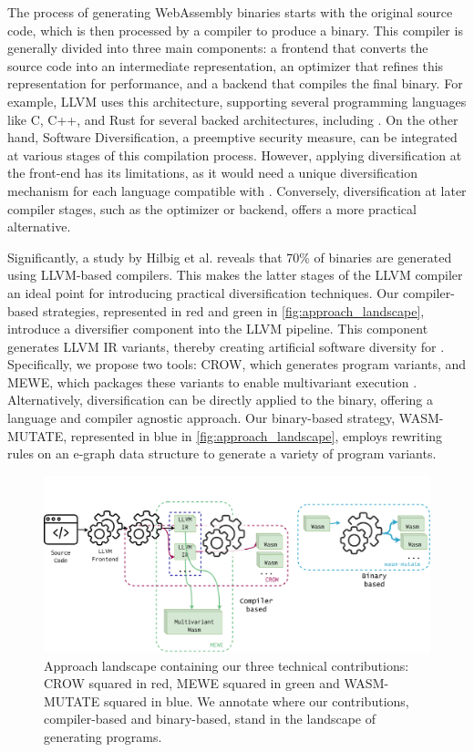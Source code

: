 
The process of generating WebAssembly binaries starts with the original source code, which is then processed by a compiler to produce a \Wasm binary. 
This compiler is generally divided into three main components: a frontend that converts the source code into an intermediate representation, an optimizer that refines this representation for performance, and a backend that compiles the final \Wasm binary. 
For example, LLVM uses this architecture, supporting several programming languages like C, C++, and Rust for several backed architectures, including  \Wasm.
On the other hand, Software Diversification, a preemptive security measure, can be integrated at various stages of this compilation process. 
However, applying diversification at the front-end has its limitations, as it would need a unique diversification mechanism for each language compatible with \Wasm. 
Conversely, diversification at later compiler stages, such as the optimizer or backend, offers a more practical alternative.

Significantly, a study by Hilbig et al. reveals that 70\% of \Wasm binaries are generated using LLVM-based compilers. 
This makes the latter stages of the LLVM compiler an ideal point for introducing practical \wasm diversification techniques. 
Our compiler-based strategies, represented in red and green in \autoref{fig:approach_landscape}, introduce a diversifier component into the LLVM pipeline. 
This component generates LLVM IR variants, thereby creating artificial software diversity for \Wasm. 
Specifically, we propose two tools: CROW, which generates \Wasm program variants, and MEWE, which packages these variants to enable multivariant execution \cite{cox06}.
Alternatively, diversification can be directly applied to the \Wasm binary, offering a language and compiler agnostic approach. 
Our binary-based strategy, WASM-MUTATE, represented in blue in \autoref{fig:approach_landscape}, employs rewriting rules on an e-graph data structure to generate a variety of \Wasm program variants.



\begin{figure}[h]
	\centering
	\includegraphics[width=1.0\textwidth]{figures/landscape.pdf}
	\caption{Approach landscape containing our three technical contributions: CROW squared in red, MEWE squared in green and WASM-MUTATE squared in blue. We annotate where our contributions, compiler-based and binary-based, stand in the landscape of generating \Wasm programs.}
	\label{fig:approach_landscape}
\end{figure}


